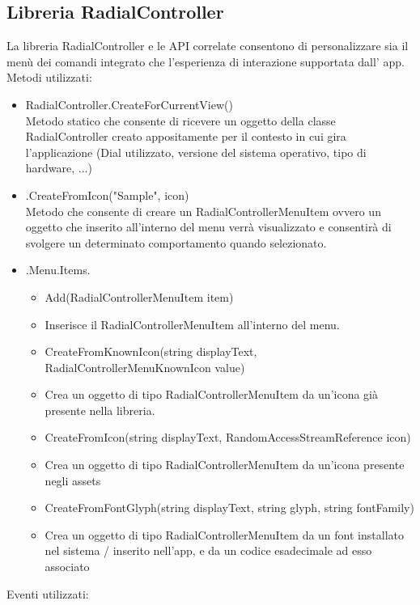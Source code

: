 \subsection{Libreria RadialController}
La libreria RadialController\cite{rad} e le API correlate consentono di personalizzare sia il menù dei comandi integrato che l'esperienza di interazione supportata dall’ app.
Metodi utilizzati:
\begin{itemize}


\item RadialController.CreateForCurrentView()\\
Metodo statico che consente di ricevere un oggetto della classe RadialController creato appositamente per il contesto in cui gira l’applicazione (Dial utilizzato, versione del sistema operativo, tipo di hardware, ...)
\item .CreateFromIcon("Sample", icon)\\
Metodo che consente di creare un RadialControllerMenuItem ovvero un oggetto che inserito all’interno del menu verrà visualizzato e consentirà di svolgere un determinato comportamento quando selezionato.
\item .Menu.Items.
\begin{itemize}
\item Add(RadialControllerMenuItem item)
\item Inserisce il RadialControllerMenuItem all’interno del menu.
\item CreateFromKnownIcon(string displayText, RadialControllerMenuKnownIcon value)
\item Crea un oggetto di tipo RadialControllerMenuItem da un’icona già presente nella libreria.
\item CreateFromIcon(string displayText, RandomAccessStreamReference icon)
\item Crea un oggetto di tipo RadialControllerMenuItem da un’icona presente negli assets
\item CreateFromFontGlyph(string displayText, string glyph, string fontFamily)
\item Crea un oggetto di tipo RadialControllerMenuItem da un font installato nel sistema / inserito nell’app, e da un codice esadecimale ad esso associato
\end{itemize}
\end{itemize}
Eventi utilizzati:
